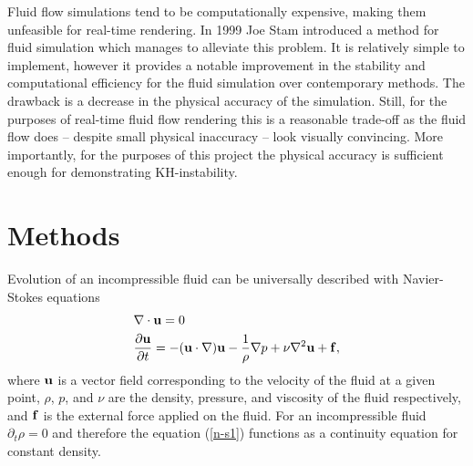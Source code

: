 \documentclass[12pt, letterpaper]{article}
\begin{document}
Fluid flow simulations tend to be computationally expensive, making them unfeasible for real-time rendering.
In 1999 Joe Stam introduced a method for fluid simulation \cite{Stam2} which manages to alleviate this problem.
It is relatively simple to implement, however it provides a notable improvement in the stability and computational efficiency for the fluid simulation over contemporary methods.
The drawback is a decrease in the physical accuracy of the simulation.
Still, for the purposes of real-time fluid flow rendering this is a reasonable trade-off as the fluid flow does -- despite small physical inaccuracy -- look visually convincing. 
More importantly, for the purposes of this project the physical accuracy is sufficient enough for demonstrating KH-instability.

\section{Methods}
Evolution of an incompressible fluid can be universally described with Navier-Stokes equations
\begin{align}
  &\nabla\cdot\vb{u} = 0 \label{n-s1}\\
  &\frac{\partial\vb{u}}{\partial t} = -(\vb{u}\cdot \nabla)\vb{u}-\frac{1}{\rho}\nabla p + \nu \nabla^{2}\vb{u} + \vb{f},\label{n-s2}
\end{align}
where $\vb{u}$ is a vector field corresponding to the velocity of the fluid at a given point, $\rho$, $p$, and $\nu$ are the density, pressure, and viscosity of the fluid respectively, and $\vb{f}$ is the external force applied on the fluid.
For an incompressible fluid $\partial_{t}\rho = 0$ and therefore the equation (\ref{n-s1}) functions as a continuity equation for constant density.
\end{document}
